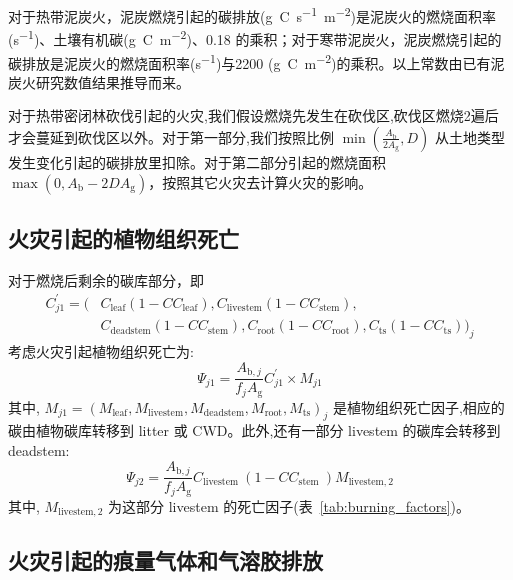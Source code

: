 对于热带泥炭火，泥炭燃烧引起的碳排放(\unit{g.C.s^{-1}.m^{-2}})是泥炭火的燃烧面积率(\unit{s^{-1}})、土壤有机碳(\unit{g.C.m^{-2}})、0.18 的乘积；对于寒带泥炭火，泥炭燃烧引起的碳排放是泥炭火的燃烧面积率(\unit{s^{-1}})与2200 (\unit{g.C.m^{-2}})的乘积。以上常数由已有泥炭火研究数值结果推导而来。

对于热带密闭林砍伐引起的火灾,我们假设燃烧先发生在砍伐区,砍伐区燃烧2遍后才会蔓延到砍伐区以外。对于第一部分,我们按照比例 $\min \left(\frac{A_{\mathrm{b}}}{2 A_{\mathrm{g}}}, D\right)$ 从土地类型发生变化引起的碳排放里扣除。对于第二部分引起的燃烧面积 $\max(0, A_{\mathrm {b}} -2DA_{\mathrm {g}} )$，按照其它火灾去计算火灾的影响。


\subsection{火灾引起的植物组织死亡}

对于燃烧后剩余的碳库部分，即
\begin{equation}
  \begin{aligned}
    C_{j 1}^{\prime}=\big(& C_{\text {leaf}}\left(1-C C_{\text {leaf}}\right), C_{\text {livestem}}\left(1-C C_{\text {stem}}\right), \\
    &C_{\text {deadstem}}\left(1-C C_{\text {stem}}\right), C_{\text {root}}\left(1-C C_{\text {root}}\right), C_{\mathrm{t s}}\left(1-C C_{\mathrm{t s}}\right)\big)_{j}
  \end{aligned}
\end{equation}
%
考虑火灾引起植物组织死亡为:
\begin{equation}
  \Psi_{j 1}=\frac{A_{\mathrm{b},j}}{f_{j} A_{\mathrm{g}}} C_{j 1}^{\prime} \times M_{j 1}
\end{equation}
%
其中, $
M_{j 1}=\left(M_{\text{leaf}}, M_{\text{livestem}}, M_{\text{deadstem}}, M_{\text {root}}, M_{\text {ts}}\right)_{j}
$ 是植物组织死亡因子,相应的碳由植物碳库转移到 litter 或 CWD。此外,还有一部分 livestem 的碳库会转移到 deadstem:
\begin{equation}
  \Psi_{j 2}=\frac{A_{\mathrm{b},j}}{f_{j} A_{\mathrm{g}}} C_{\text {livestem }}\left(1-C C_{\text {stem }}\right) M_{\text {livestem}, 2}
\end{equation}
%
其中, $M_{\text{livestem},2}$ 为这部分 livestem 的死亡因子(表~\ref{tab:burning_factors})。


\subsection{火灾引起的痕量气体和气溶胶排放}

